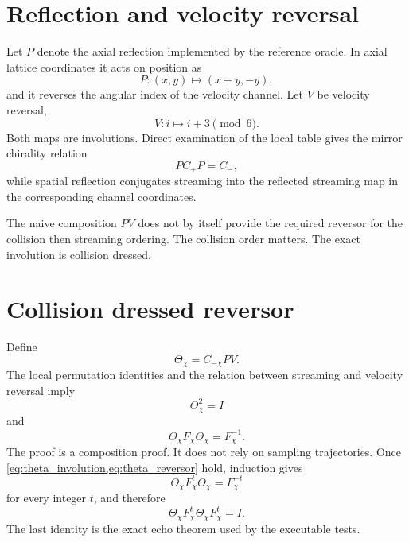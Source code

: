 \section{Reflection and velocity reversal}
Let $P$ denote the axial reflection implemented by the reference oracle. In axial lattice coordinates it acts on position as
\begin{equation}
 P:(x,y)\mapsto(x+y,-y),
 \label{eq:axial_reflection}
\end{equation}
and it reverses the angular index of the velocity channel. Let $V$ be velocity reversal,
\begin{equation}
 V:i\mapsto i+3\pmod 6.
 \label{eq:velocity_reversal}
\end{equation}
Both maps are involutions. Direct examination of the local table gives the mirror chirality relation
\begin{equation}
 P C_{+} P=C_{-},
 \label{eq:collision_mirror}
\end{equation}
while spatial reflection conjugates streaming into the reflected streaming map in the corresponding channel coordinates.

The naive composition $PV$ does not by itself provide the required reversor for the collision then streaming ordering. The collision order matters. The exact involution is collision dressed.

\section{Collision dressed reversor}
Define
\begin{equation}
 \Theta_\chi=C_{-\chi}PV.
 \label{eq:theta_def}
\end{equation}
The local permutation identities and the relation between streaming and velocity reversal imply
\begin{equation}
 \Theta_\chi^2=I
 \label{eq:theta_involution}
\end{equation}
and
\begin{equation}
 \Theta_\chi F_\chi\Theta_\chi=F_\chi^{-1}.
 \label{eq:theta_reversor}
\end{equation}
The proof is a composition proof. It does not rely on sampling trajectories. Once \cref{eq:theta_involution,eq:theta_reversor} hold, induction gives
\begin{equation}
 \Theta_\chi F_\chi^t\Theta_\chi=F_\chi^{-t}
 \label{eq:theta_time}
\end{equation}
for every integer $t$, and therefore
\begin{equation}
 \Theta_\chi F_\chi^t\Theta_\chi F_\chi^t=I.
 \label{eq:echo_identity}
\end{equation}
The last identity is the exact echo theorem used by the executable tests.

